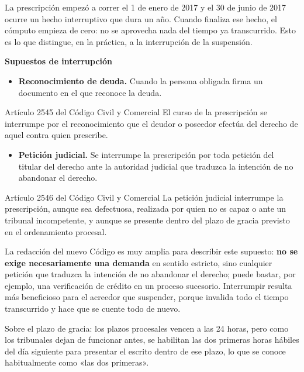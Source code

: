 \documentclass[12pt,oneside]{book}
\begin{document}
\begin{ejemplo}
La prescripción empezó a correr el 1 de enero de 2017 y el 30 de junio de 2017 ocurre un hecho interruptivo que dura un año. Cuando finaliza ese hecho, el cómputo empieza de cero: no se aprovecha nada del tiempo ya transcurrido. Esto es lo que distingue, en la práctica, a la interrupción de la suspensión.
\end{ejemplo}

\textbf{Supuestos de interrupción}

\begin{itemize}
    \item \textbf{Reconocimiento de deuda.} Cuando la persona obligada firma un documento en el que reconoce la deuda.
\end{itemize}

\begin{articulo}{Artículo 2545 del Código Civil y Comercial}
El curso de la prescripción se interrumpe por el reconocimiento que el deudor o poseedor efectúa del derecho de aquel contra quien prescribe.
\end{articulo}

\begin{itemize}
    \item \textbf{Petición judicial.} Se interrumpe la prescripción por toda petición del titular del derecho ante la autoridad judicial que traduzca la intención de no abandonar el derecho.
\end{itemize}

\begin{articulo}{Artículo 2546 del Código Civil y Comercial}
La petición judicial interrumpe la prescripción, aunque sea defectuosa, realizada por quien no es capaz o ante un tribunal incompetente, y aunque se presente dentro del plazo de gracia previsto en el ordenamiento procesal.
\end{articulo}

La redacción del nuevo Código es muy amplia para describir este supuesto: \textbf{no se exige necesariamente una demanda} en sentido estricto, sino cualquier petición que traduzca la intención de no abandonar el derecho; puede bastar, por ejemplo, una verificación de crédito en un proceso sucesorio. Interrumpir resulta más beneficioso para el acreedor que suspender, porque invalida todo el tiempo transcurrido y hace que se cuente todo de nuevo.

Sobre el plazo de gracia: los plazos procesales vencen a las 24 horas, pero como los tribunales dejan de funcionar antes, se habilitan las dos primeras horas hábiles del día siguiente para presentar el escrito dentro de ese plazo, lo que se conoce habitualmente como «las dos primeras».
\end{document}

